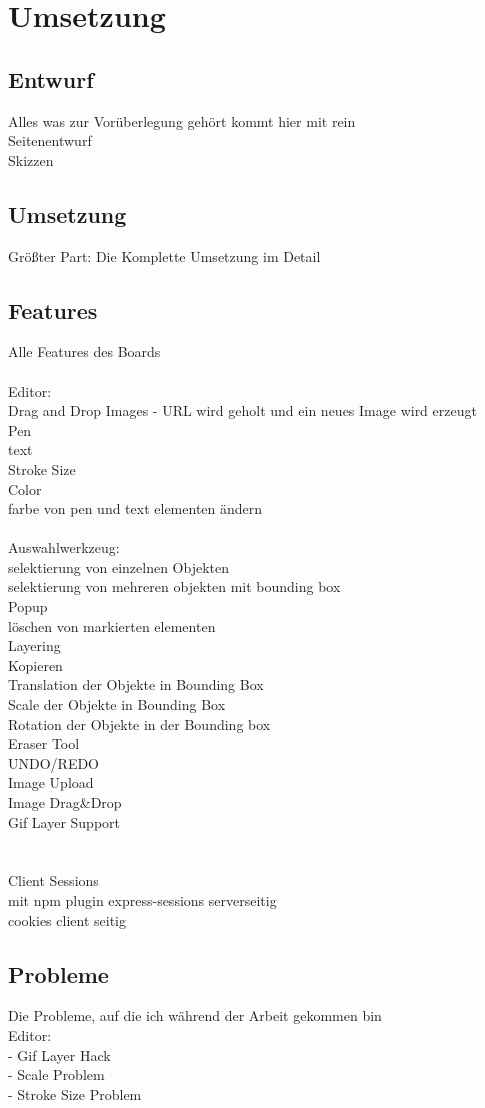 \chapter{Umsetzung}\label{Bauhausboard}
\section{Entwurf}\label{Entwurf}
Alles was zur Vorüberlegung gehört kommt hier mit rein\\
Seitenentwurf\\
Skizzen\\

\section{Umsetzung}\label{Umsetzung}
Größter Part: Die Komplette Umsetzung im Detail
\section{Features}\label{Features}
Alle Features des Boards\\
\\
Editor:\\
Drag and Drop Images - URL wird geholt und ein neues Image wird erzeugt\\
Pen\\
text\\
Stroke Size\\
Color\\
farbe von pen und text elementen ändern\\
\\
Auswahlwerkzeug:\\
selektierung von einzelnen Objekten\\
selektierung von mehreren objekten mit bounding box\\
Popup\\
löschen von markierten elementen\\
Layering\\
Kopieren\\
Translation der Objekte in Bounding Box\\
Scale der Objekte in Bounding Box\\
Rotation der Objekte in der Bounding box\\
Eraser Tool\\
UNDO/REDO\\
Image Upload\\
Image Drag&Drop\\
Gif Layer Support\\
\\
\\
Client Sessions\\
mit npm plugin express-sessions serverseitig\\
cookies client seitig

\section{Probleme}\label{Probleme}
Die Probleme, auf die ich während der Arbeit gekommen bin\\
Editor:\\
- Gif Layer Hack\\
- Scale Problem\\
- Stroke Size Problem\\
